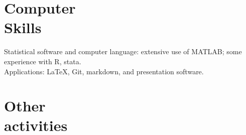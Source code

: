 \documentclass[margin,line]{res}
\newenvironment{list1}{
  \begin{list}{\ding{113}}{%
      \setlength{\itemsep}{0in}
      \setlength{\parsep}{0in} \setlength{\parskip}{0in}
      \setlength{\topsep}{0in} \setlength{\partopsep}{0in} 
      \setlength{\leftmargin}{0.17in}}}{\end{list}}
\begin{document}
\begin{resume}
\section{\sc Computer \\ Skills} 
Statistical software and computer language:  extensive use of MATLAB; some experience with R, stata.\\
Applications: \LaTeX, Git, markdown, and presentation software.\\

\section{\sc Other \\ activities} 


\end{resume}
\end{document}
